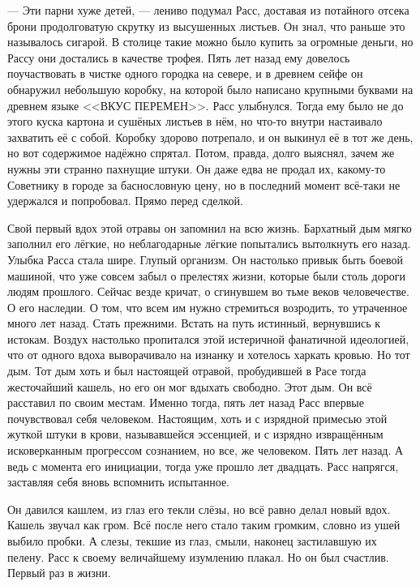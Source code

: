 \noindent --- Эти парни хуже детей, --- лениво подумал Расс, доставая из 
потайного отсека брони продолговатую скрутку из высушенных листьев. Он знал, что 
раньше это называлось сигарой. В столице такие можно было купить за огромные 
деньги, но Рассу они достались в качестве трофея. Пять лет назад ему довелось 
поучаствовать в чистке одного городка на севере, и в древнем сейфе он обнаружил 
небольшую коробку, на которой было написано крупными буквами на древнем языке 
<<ВКУС ПЕРЕМЕН>>. Расс улыбнулся. Тогда ему было не до этого куска картона и 
сушёных листьев в нём, но что-то внутри настаивало захватить её с собой. Коробку 
здорово потрепало, и он выкинул её в тот же день, но вот содержимое надёжно 
спрятал. Потом, правда, долго выяснял, зачем же нужны эти странно пахнущие 
штуки. Он даже едва не продал их, какому-то Советнику в городе за баснословную 
цену, но в последний момент всё-таки не удержался и попробовал. Прямо перед 
сделкой. 

Свой первый вдох этой отравы он запомнил на всю жизнь. Бархатный дым мягко 
заполнил его лёгкие, но неблагодарные лёгкие попытались вытолкнуть его назад. 
Улыбка Расса стала шире. Глупый организм. Он настолько привык быть боевой 
машиной, что уже совсем забыл о прелестях жизни, которые были столь дороги людям 
прошлого. Сейчас везде кричат, о сгинувшем во тьме веков человечестве. О его 
наследии. О том, что всем им нужно стремиться возродить, то утраченное много лет 
назад. Стать прежними. Встать на путь истинный, вернувшись к истокам. Воздух 
настолько пропитался этой истеричной фанатичной идеологией, что от одного вдоха 
выворачивало на изнанку и хотелось харкать кровью. Но тот дым. Тот дым хоть и 
был настоящей отравой, пробудившей в Расе тогда жесточайший кашель, но его он 
мог вдыхать свободно. Этот дым. Он всё расставил по своим местам. Именно тогда, 
пять лет назад Расс впервые почувствовал себя человеком. Настоящим, хоть и с 
изрядной примесью этой жуткой штуки в крови, называвшейся эссенцией, и с изрядно 
извращённым исковерканным прогрессом сознанием, но все, же человеком. Пять лет 
назад. А ведь с момента его инициации, тогда уже прошло лет двадцать. Расс 
напрягся, заставляя себя вновь вспомнить испытанное.

Он давился кашлем, из глаз его текли слёзы, но всё равно делал новый вдох. 
Кашель звучал как гром. Всё после него стало таким громким, словно из ушей 
выбило пробки. А слезы, текшие из глаз, смыли, наконец застилавшую их пелену. 
Расс к своему величайшему изумлению плакал. Но он был счастлив. Первый раз в 
жизни.

